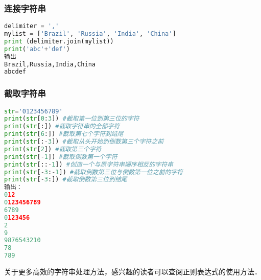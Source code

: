 \subsubsection{连接字符串}
\begin{lstlisting}[language=python]
delimiter = ','
mylist = ['Brazil', 'Russia', 'India', 'China']
print (delimiter.join(mylist))
print('abc'+'def')
输出
Brazil,Russia,India,China
abcdef
\end{lstlisting}

\subsubsection{截取字符串}
\begin{lstlisting}[language=python]
str='0123456789'
print(str[0:3]) #截取第一位到第三位的字符
print(str[:]) #截取字符串的全部字符
print(str[6:]) #截取第七个字符到结尾
print(str[:-3]) #截取从头开始到倒数第三个字符之前
print(str[2]) #截取第三个字符
print(str[-1]) #截取倒数第一个字符
print(str[::-1]) #创造一个与原字符串顺序相反的字符串
print(str[-3:-1]) #截取倒数第三位与倒数第一位之前的字符
print(str[-3:]) #截取倒数第三位到结尾
输出：
012
0123456789
6789
0123456
2
9
9876543210
78
789
\end{lstlisting}


关于更多高效的字符串处理方法，感兴趣的读者可以查阅正则表达式的使用方法．
